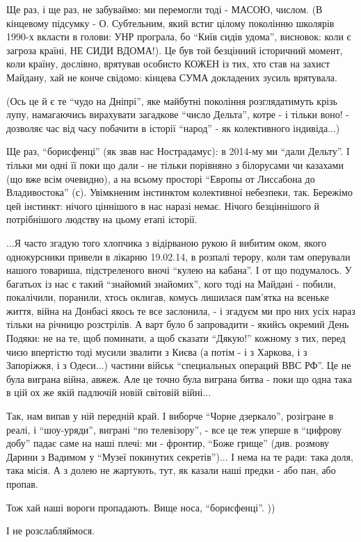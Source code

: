 Ще раз, і ще раз, не забуваймо: ми перемогли тоді - МАСОЮ, числом. (В кінцевому
підсумку - О. Субтельним, який встиг цілому поколінню школярів 1990-х вкласти в
голови: УНР програла, бо \enquote{Київ сидів удома}, висновок: коли є загроза країні,
НЕ СИДИ ВДОМА!). Це був той безцінний історичний момент, коли країну, дослівно,
врятував особисто КОЖЕН із тих, хто став на захист Майдану, хай не конче
свідомо: кінцева СУМА докладених зусиль врятувала. 

(Ось це й є те \enquote{чудо на Дніпрі}, яке майбутні покоління розглядатимуть крізь
лупу, намагаючись вирахувати загадкове \enquote{число Дельта}, котре - і тільки воно! -
дозволяє час від часу побачити в історії \enquote{народ} - як колективного індивіда...)

Ще раз, \enquote{борисфенці} (як звав нас Нострадамус): в 2014-му ми \enquote{дали Дельту}. І
тільки ми одні її поки що дали - не тільки порівняно з білорусами чи казахами
(що вже всім очевидно), а на всьому просторі \enquote{Европы от Лиссабона до
Владивостока} (с). Увімкненим інстинктом колективної небезпеки, так. Бережімо
цей інстинкт: нічого ціннішого в нас наразі немає. Нічого безціннішого й
потрібнішого людству на цьому етапі історії.  

...Я часто згадую того хлопчика з відірваною рукою й вибитим оком, якого
однокурсники привели в лікарню 19.02.14, в розпалі терору, коли там оперували
нашого товариша, підстреленого вночі \enquote{кулею на кабана}. І от що подумалось. У
багатьох із нас є такий \enquote{знайомий знайомих}, кого тоді на Майдані - побили,
покалічили, поранили, хтось оклигав, комусь лишилася пам'ятка на всеньке життя,
війна на Донбасі якось те все заслонила, - і згадуєм ми про них усіх нараз
тільки на річницю розстрілів. А варт було б запровадити - якийсь окремий День
Подяки: не на те, щоб поминати, а щоб сказати \enquote{Дякую!} кожному з тих, перед
чиєю впертістю тоді мусили звалити з Києва (а потім - і з Харкова, і з
Запоріжжя, і з Одеси...) частини військ \enquote{специальных операций ВВС РФ}. Це не
була виграна війна, авжеж. Але це точно була виграна битва - поки що одна така
в цій ох же якій падлючій новій світовій війні...


Так, нам випав у ній передній край. І виборче \enquote{Чорне дзеркало}, розігране в
реалі, і \enquote{шоу-уряди}, виграні \enquote{по телевізору}, - все це теж уперше в \enquote{цифрову
добу} падає саме на наші плечі: ми - фронтир, \enquote{Боже грище} (див. розмову Дарини
з Вадимом у \enquote{Музеї покинутих секретів})... І нема на те ради: така доля, така
місія. А з долею не жартують, тут, як казали наші предки - або пан, або пропав. 

Тож хай наші вороги пропадають. Вище носа, \enquote{борисфенці}. ))

І не розслабляймося. 

